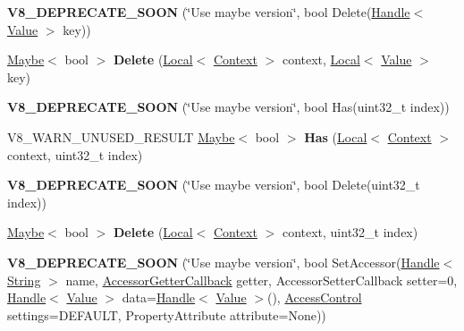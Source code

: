 \begin{DoxyCompactItemize}
\item 
\hypertarget{classv8_1_1_object_aa194e49f837afb3a32cda7b0dfd272f8}{}{\bfseries V8\+\_\+\+D\+E\+P\+R\+E\+C\+A\+T\+E\+\_\+\+S\+O\+O\+N} (\char`\"{}Use maybe version\char`\"{}, bool Delete(\hyperlink{classv8_1_1_local}{Handle}$<$ \hyperlink{classv8_1_1_value}{Value} $>$ key))\label{classv8_1_1_object_aa194e49f837afb3a32cda7b0dfd272f8}

\item 
\hypertarget{classv8_1_1_object_ab0626985ff54cbeeccef5e50656e5481}{}\hyperlink{classv8_1_1_maybe}{Maybe}$<$ bool $>$ {\bfseries Delete} (\hyperlink{classv8_1_1_local}{Local}$<$ \hyperlink{classv8_1_1_context}{Context} $>$ context, \hyperlink{classv8_1_1_local}{Local}$<$ \hyperlink{classv8_1_1_value}{Value} $>$ key)\label{classv8_1_1_object_ab0626985ff54cbeeccef5e50656e5481}

\item 
\hypertarget{classv8_1_1_object_a54ea0720cf71e2898049d05c44ef2133}{}{\bfseries V8\+\_\+\+D\+E\+P\+R\+E\+C\+A\+T\+E\+\_\+\+S\+O\+O\+N} (\char`\"{}Use maybe version\char`\"{}, bool Has(uint32\+\_\+t index))\label{classv8_1_1_object_a54ea0720cf71e2898049d05c44ef2133}

\item 
\hypertarget{classv8_1_1_object_adfbff82d3a45a69415ae99013a654daa}{}V8\+\_\+\+W\+A\+R\+N\+\_\+\+U\+N\+U\+S\+E\+D\+\_\+\+R\+E\+S\+U\+L\+T \hyperlink{classv8_1_1_maybe}{Maybe}$<$ bool $>$ {\bfseries Has} (\hyperlink{classv8_1_1_local}{Local}$<$ \hyperlink{classv8_1_1_context}{Context} $>$ context, uint32\+\_\+t index)\label{classv8_1_1_object_adfbff82d3a45a69415ae99013a654daa}

\item 
\hypertarget{classv8_1_1_object_a97a29f705ad4a7dda2f04d80dd80ef98}{}{\bfseries V8\+\_\+\+D\+E\+P\+R\+E\+C\+A\+T\+E\+\_\+\+S\+O\+O\+N} (\char`\"{}Use maybe version\char`\"{}, bool Delete(uint32\+\_\+t index))\label{classv8_1_1_object_a97a29f705ad4a7dda2f04d80dd80ef98}

\item 
\hypertarget{classv8_1_1_object_aabd005ef33ff69c15562d5296f4982d0}{}\hyperlink{classv8_1_1_maybe}{Maybe}$<$ bool $>$ {\bfseries Delete} (\hyperlink{classv8_1_1_local}{Local}$<$ \hyperlink{classv8_1_1_context}{Context} $>$ context, uint32\+\_\+t index)\label{classv8_1_1_object_aabd005ef33ff69c15562d5296f4982d0}

\item 
\hypertarget{classv8_1_1_object_aa0a18b48e2503113d72b092688e5bd34}{}{\bfseries V8\+\_\+\+D\+E\+P\+R\+E\+C\+A\+T\+E\+\_\+\+S\+O\+O\+N} (\char`\"{}Use maybe version\char`\"{}, bool Set\+Accessor(\hyperlink{classv8_1_1_local}{Handle}$<$ \hyperlink{classv8_1_1_string}{String} $>$ name, \hyperlink{namespacev8_a722613c87061708a4f1aa050d095f868}{Accessor\+Getter\+Callback} getter, Accessor\+Setter\+Callback setter=0, \hyperlink{classv8_1_1_local}{Handle}$<$ \hyperlink{classv8_1_1_value}{Value} $>$ data=\hyperlink{classv8_1_1_local}{Handle}$<$ \hyperlink{classv8_1_1_value}{Value} $>$(), \hyperlink{namespacev8_a31d8355cb043d7d2dda3f4a52760b64e}{Access\+Control} settings=D\+E\+F\+A\+U\+L\+T, Property\+Attribute attribute=None))\label{classv8_1_1_object_aa0a18b48e2503113d72b092688e5bd34}


\end{DoxyCompactItemize}
